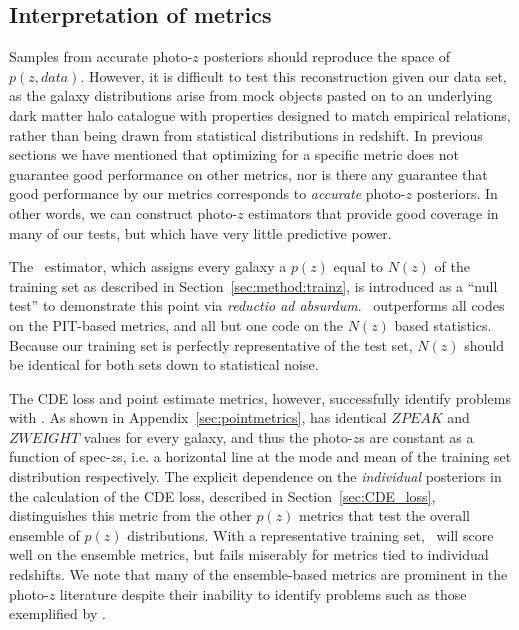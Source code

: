 \subsection{Interpretation of metrics}\label{sec:caution}

Samples from accurate photo-$z$ posteriors should reproduce the space of $p(z, data)$. However, it is difficult to test this reconstruction given our data set, as the galaxy distributions arise from mock objects pasted on to an underlying dark matter halo catalogue with properties designed to match empirical relations, rather than being drawn from statistical distributions in redshift.  In previous sections we have mentioned that optimizing for a specific metric does not guarantee good performance on other metrics, nor is there any guarantee that good performance by our metrics corresponds to \textit{accurate} photo-$z$ posteriors.
In other words, we can construct photo-$z$ estimators that provide good coverage in many of our tests, but which have very little predictive power.


The \trainz\ estimator, which assigns every galaxy a $p(z)$ equal to $N(z)$ of the training set as described in Section~\ref{sec:method:trainz}, is introduced as a ``null test'' to demonstrate this point via \textit{reductio ad absurdum}.
\trainz\ outperforms all codes on the PIT-based metrics, and all but one code on the $N(z)$ based statistics.
Because our training set is perfectly representative of the test set, $N(z)$ should be identical for both sets down to statistical noise.

The CDE loss and point estimate metrics, however, successfully identify problems with \trainz.
As shown in Appendix~\ref{sec:pointmetrics}, \trainz has identical $ZPEAK$ and $ZWEIGHT$ values for every galaxy, and thus the photo-$z$s are constant as a function of spec-$z$s, i.e. a horizontal line at the mode and mean of the training set distribution respectively.  The explicit dependence on the {\it individual} posteriors in the calculation of the CDE loss, described in Section~\ref{sec:CDE_loss}, distinguishes this metric from the other $p(z)$ metrics that test the overall ensemble of $p(z)$ distributions.  With a representative training set, \trainz\ will score well on the ensemble metrics, but fails miserably for metrics tied to individual redshifts.  We note that many of the ensemble-based metrics are prominent in the photo-$z$ literature despite their inability to identify problems such as those exemplified by \trainz.

